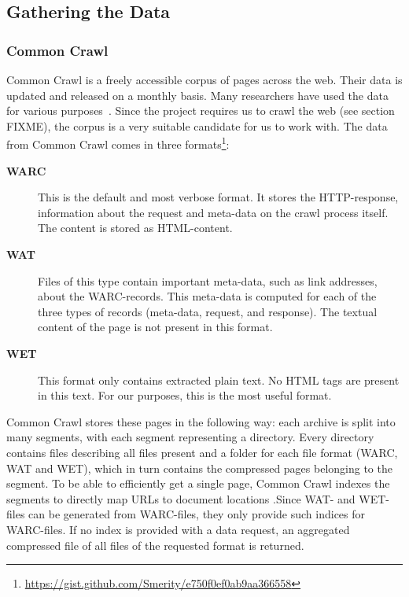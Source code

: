 \subsection{Gathering the Data}

\subsubsection{Common Crawl} \label{sec:commoncrawl}
Common Crawl \cite{commoncrawl} is a freely accessible corpus of pages across the web. Their data is updated and released on a monthly basis. Many researchers have used the data for various purposes~\cite{smith2013dirt, muhleisen2012web, singh2012wikilinks}. Since the project requires us to crawl the web (see section {\color{red} FIXME}), the corpus is a very suitable candidate for us to work with. The data from Common Crawl comes in three    formats\footnote{\url{https://gist.github.com/Smerity/e750f0ef0ab9aa366558}}: 
\begin{description}
\item[\textbf{WARC}] This is the default and most verbose format. It stores the HTTP-response, information about the request and meta-data on the crawl process itself. The content is stored as HTML-content.
\item[\textbf{WAT}] Files of this type contain important meta-data, such as link addresses, about the WARC-records. This meta-data is computed for each of the three types of records (meta-data, request, and response). The textual content of the page is not present in this format.
\item[\textbf{WET}] This format only contains extracted plain text. No HTML tags are present in this text. For our purposes, this is the most useful format.
\end{description}

Common Crawl stores these pages in the following way: each archive is split into many segments, with each segment representing a directory. Every directory contains files describing all files present and a folder for each file format (WARC, WAT and WET), which in turn contains the compressed pages belonging to the segment. To be able to efficiently get a single page, Common Crawl indexes the segments to directly map URLs to document locations  .Since WAT- and WET-files can be generated from WARC-files, they only provide such indices for WARC-files. If no index is provided with a data request, an aggregated compressed file of all files of the requested format is returned.

